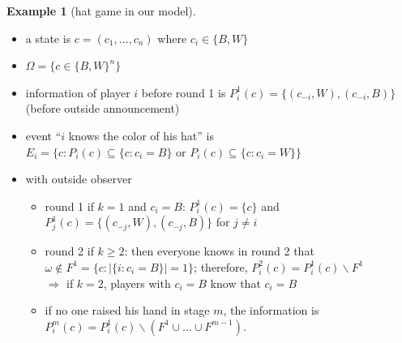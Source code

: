 \documentclass{beamer}    %
\newcommand{\Ra}{\Rightarrow}
\theoremstyle{plain}
\theoremstyle{definition}
\newtheorem{ex}{Example}
\begin{document}
{\begin{ex}[hat game in our model]
  \begin{itemize}
  \item a state is $c=(c_1,\dots,c_n)$ where  $c_i\in\{B,W\}$ 
   \item $\Omega=\{c\in\{B,W\}^n\}$ 
   \item information of player $i$ before round 1 is $P_i^1(c)=\{(c_{-i},W),(c_{-i},B)\}$ (before outside announcement)
   \item event ``$i$ knows the color of his hat'' is
$E_i=\{c: P_i(c)\subseteq\{c:c_i=B\}\text{ or }P_i(c)\subseteq\{c:c_i=W\}\}$
  \item with outside observer
    \begin{itemize}
    \item round 1 if $k=1$ and $c_i=B$:
      $P_i^1(c)=\{c\}$ and $P_j^1(c)=\{(c_{-j},W),(c_{-j},B)\}$ for $j\neq i$
    \item  round 2 if $k\geq 2$: then everyone knows in round 2 that $\omega\not\in F^1=\{c:|\{i:c_i=B\}| =1\}$; therefore, $P_i^2(c)=P_i^1(c)\backslash F^1$\\
   $\Ra$ if $k=2$, players with $c_i=B$ know that $c_i=B$
   \item   if no one raised his hand in stage $m$, the information is $P_i^m(c)=P_i^1(c)\backslash (F^1\cup\dots\cup F^{m-1})$.
    \end{itemize}
  \end{itemize}
\end{ex}
}
\end{document}
